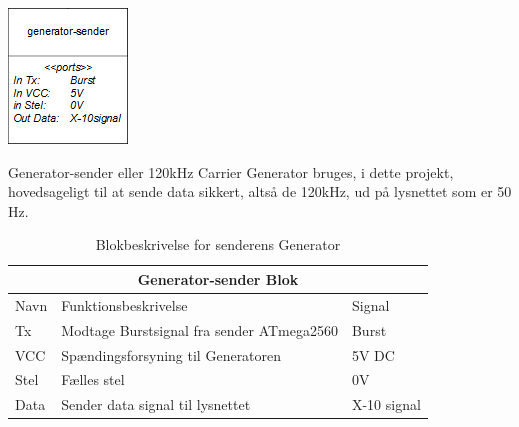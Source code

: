\documentclass[11pt]{article}
\begin{document}

\begin{minipage}[Ht]{0.40\linewidth}
	\centering
	\includegraphics{Generator-sender-blok.png}
\end{minipage}
\hfill
\begin{minipage}[!t]{0.60\linewidth}
	\centering
   		Generator-sender eller 120kHz Carrier Generator bruges, i dette projekt, hovedsageligt til at sende data sikkert, altså de 120kHz, ud på lysnettet som er 50 Hz. 
\end{minipage}%
\hfill

\begin{table}[H]
\centering
	\begin{tabular}{l|l|l}
	
	\toprule[0.4mm]\midrule \multicolumn{3}{c}{\textbf{Generator-sender Blok}}\\
	\midrule[0.4mm] Navn & Funktionsbeskrivelse & Signal\\ \midrule[0.3mm]
	 Tx & Modtage Burstsignal fra sender ATmega2560 & Burst\\
	 VCC & Spændingsforsyning til Generatoren & 5V DC\\
	 Stel & Fælles stel  & 0V\\
 	 Data & Sender data signal til lysnettet & X-10 signal\\
	 \midrule\bottomrule[0.4mm]

	\end{tabular}
	\caption{Blokbeskrivelse for senderens Generator}
	\label{tab: Bloktabel Generator sender}
\end{table}
\qquad
\end{document}
